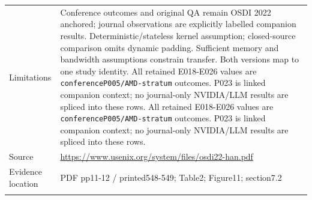 \begin{longtable}{>{\raggedright\arraybackslash}p{}>{\raggedright\arraybackslash}p{}}
Limitations & Conference outcomes and original QA remain OSDI 2022 anchored; journal observations are explicitly labelled companion results. Deterministic/stateless kernel assumption; closed-source comparison omits dynamic padding. Sufficient memory and bandwidth assumptions constrain transfer. Both versions map to one study identity. All retained E018-E026 values are \nolinkurl{conferenceP005/AMD-stratum} outcomes. P023 is linked companion context; no journal-only NVIDIA/LLM results are spliced into these rows. All retained E018-E026 values are \nolinkurl{conferenceP005/AMD-stratum} outcomes. P023 is linked companion context; no journal-only NVIDIA/LLM results are spliced into these rows.\\\addlinespace
Source & \url{https://www.usenix.org/system/files/osdi22-han.pdf}\\\addlinespace
Evidence location & PDF pp11-12 / printed548-549; Table2; Figure11; section7.2\\\addlinespace
\bottomrule\end{longtable}

